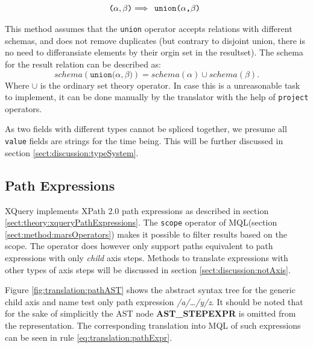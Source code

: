 \begin{equation}
\centering
\texttt{(} \alpha , \beta \texttt{)}
\Longrightarrow
\begin{array}{l}
\mbox{\texttt{union(}} 
\alpha \mbox{\texttt{,}} 
\beta \mbox{\texttt{)}}
\end{array}
\label{eq:translation:sequencing}
\end{equation}

This method assumes that the \texttt{union} operator accepts relations with
different schemas, and does not remove duplicates (but contrary to disjoint
union, there is no need to differansiate elements by their orgin set in the
resultset). The schema for the result relation can be described as:
\begin{equation*}
schema(\texttt{union(}\alpha, \beta\texttt{)}) = schema(\alpha) \cup
schema(\beta).
\end{equation*}
Where $\cup$ is the ordinary set theory operator. In case this is a
unreasonable task to implement, it can be done manually by the translator with
the help of \texttt{project} operators.

As two fields with different types cannot be spliced together, we presume all
\texttt{value} fields are strings for the time being. This will be further
discussed in section \ref{sect:discussion:typeSystem}.



\subsection{Path Expressions}
\label{sect:translation:smpPathExpr}
XQuery implements XPath 2.0 path expressions as described in section
\ref{sect:theory:xqueryPathExpressions}. The \texttt{scope} operator of
MQL(section \ref{sect:method:marsOperators}) makes it possible to
filter results based on the scope. The operator does however only support paths
equivalent to path expressions with only \textit{child} axis steps. Methods to
translate expressions with other types of axis steps will be discussed in
section \ref{sect:discussion:notAxis}.

Figure \ref{fig:translation:pathAST} shows the abstract syntax tree for the
generic child axis and name test only path expression \textit{/a/\ldots/y/z}. It
should be noted that for the sake of simplicitly the AST node \textbf{AST\_STEPEXPR} is
omitted from the representation. The corresponding translation into MQL of such
expressions can be seen in rule \ref{eq:translation:pathExpr}.


